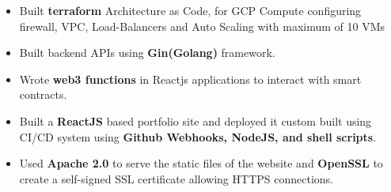 \documentclass[10pt,a4paper,ragged2e,withhyper]{altacv}
\begin{document}
\begin{paracol}{2}





\begin{itemize}
\item Built {\bf terraform} Architecture as Code, for GCP Compute configuring firewall, VPC, Load-Balancers and Auto Scaling with maximum of 10 VMs
\item Built backend APIs using {\bf Gin(Golang)} framework.
\item Wrote {\bf web3 functions} in Reactjs applications to interact with smart contracts.
\end{itemize}


\begin{itemize}
\item Built a {\bf ReactJS} based portfolio site and deployed it custom built using CI/CD system using {\bf Github Webhooks, NodeJS, and shell scripts}.
\item Used {\bf Apache 2.0} to serve the static files of the website and {\bf OpenSSL} to create a self-signed SSL certificate allowing HTTPS connections.
\end{itemize}



\end{paracol}
\end{document}

